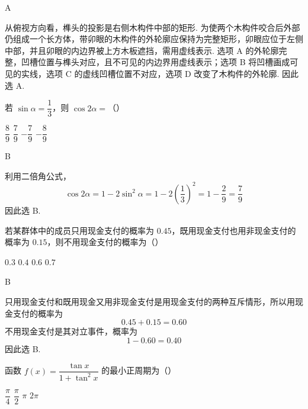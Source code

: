 \begin{answer}
A
\end{answer}

\begin{solution}
从俯视方向看，榫头的投影是右侧木构件中部的矩形. 为使两个木构件咬合后外部仍组成一个长方体，带卯眼的木构件的外轮廓应保持为完整矩形，卯眼应位于左侧中部，并且卯眼的内边界被上方木板遮挡，需用虚线表示. 选项 A 的外轮廓完整，凹槽位置与榫头对应，且不可见的内边界用虚线表示；选项 B 将凹槽画成可见的实线，选项 C 的虚线凹槽位置不对应，选项 D 改变了木构件的外轮廓. 因此选 A.
\end{solution}

\begin{problem}
若 \(\sin\alpha=\dfrac13\)，则 \(\cos2\alpha=\)（\quad）

\choices
    {\(\dfrac89\)}
    {\(\dfrac79\)}
    {\(-\dfrac79\)}
    {\(-\dfrac89\)}
\end{problem}

\begin{answer}
B
\end{answer}

\begin{solution}
利用二倍角公式，
\[
\cos2\alpha=1-2\sin^2\alpha
=1-2\left(\frac13\right)^2
=1-\frac29=\frac79
\]
因此选 B.
\end{solution}

\begin{problem}
若某群体中的成员只用现金支付的概率为 \(0.45\)，既用现金支付也用非现金支付的概率为 \(0.15\)，则不用现金支付的概率为（\quad）

\choices
    {\(0.3\)}
    {\(0.4\)}
    {\(0.6\)}
    {\(0.7\)}
\end{problem}

\begin{answer}
B
\end{answer}

\begin{solution}
只用现金支付和既用现金又用非现金支付是用现金支付的两种互斥情形，所以用现金支付的概率为
\[
0.45+0.15=0.60
\]
不用现金支付是其对立事件，概率为
\[
1-0.60=0.40
\]
因此选 B.
\end{solution}

\begin{problem}
函数 \(f(x)=\dfrac{\tan x}{1+\tan^2 x}\) 的最小正周期为（\quad）

\choices
    {\(\dfrac\pi4\)}
    {\(\dfrac\pi2\)}
    {\(\pi\)}
    {\(2\pi\)}
\end{problem}

